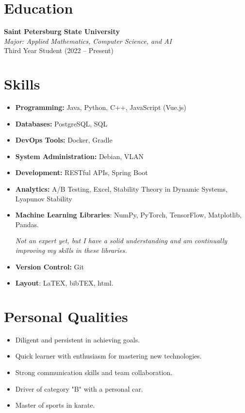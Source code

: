 \documentclass[a4paper,10pt]{article}
\begin{document}
\vspace{0.5cm}

\section*{Education}

\textbf{Saint Petersburg State University} \\
\textit{Major: Applied Mathematics, Computer Science, and AI} \\
Third Year Student (2022 – Present)

\vspace{0.5cm}

\section*{Skills}

\begin{itemize}
    \item \textbf{Programming:} Java, Python, C++, JavaScript (Vue.js)
    \item \textbf{Databases:} PostgreSQL, SQL
    \item \textbf{DevOps Tools:} Docker, Gradle
    \item \textbf{System Administration:} Debian, VLAN
    \item \textbf{Development:} RESTful APIs, Spring Boot
    \item \textbf{Analytics:} A/B Testing, Excel, Stability Theory in Dynamic Systems, Lyapunov Stability
    \item \textbf{Machine Learning Libraries}: NumPy, PyTorch, TensorFlow, Matplotlib, Pandas.
    
     \textit{Not an expert yet, but I have a solid understanding and am continually improving my skills in these libraries.}
    \item \textbf{Version Control:} Git
    \item \textbf{Layout}: LaTEX, bibTEX, html.
\end{itemize}

\vspace{0.5cm}

\section*{Personal Qualities}

\begin{itemize}
    \item Diligent and persistent in achieving goals.
    \item Quick learner with enthusiasm for mastering new technologies.
    \item Strong communication skills and team collaboration.
    \item Driver of category "B" with a personal car.
    \item Master of sports in karate.
\end{itemize}
\end{document}
